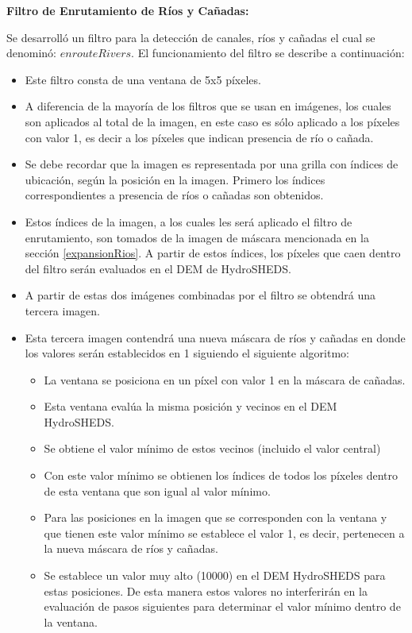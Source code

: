 \documentclass[10pt,a4paper, twoside]{report}
\begin{document}
\textbf{Filtro de Enrutamiento de Ríos y Cañadas:} 

Se desarrolló un filtro para la detección de canales, ríos y cañadas el cual se denominó: $enrouteRivers$. El funcionamiento del filtro se describe a continuación:

\begin{itemize}
	\item Este filtro consta de una ventana de 5x5 píxeles. 
	\item A diferencia de la mayoría de los filtros que se usan en imágenes, los cuales son aplicados al total de la imagen, en este caso es sólo aplicado a los píxeles con valor 1, es decir a los píxeles que indican presencia de río o cañada. 
	\item Se debe recordar que la imagen es representada por una grilla con índices de ubicación, según la posición en la imagen. Primero los índices correspondientes a presencia de ríos o cañadas son obtenidos.
	\item Estos índices de la imagen, a los cuales les será aplicado el filtro de enrutamiento, son tomados de la imagen de máscara mencionada en la sección \ref{expansionRios}. A partir de estos índices, los píxeles que caen dentro del filtro serán evaluados en el DEM de HydroSHEDS.
	\item A partir de estas dos imágenes combinadas por el filtro se obtendrá una tercera imagen.
	\item Esta tercera imagen contendrá una nueva máscara de ríos y cañadas en donde los valores serán establecidos en 1 siguiendo el siguiente algoritmo:	
	\begin{itemize}
		\item La ventana se posiciona en un píxel con valor 1 en la máscara de cañadas.
		\item Esta ventana evalúa la misma posición y vecinos en el DEM HydroSHEDS.
		\item Se obtiene el valor mínimo de estos vecinos (incluido el valor central)
		\item Con este valor mínimo se obtienen los índices de todos los píxeles dentro de esta ventana que son igual al valor mínimo.
		\item Para las posiciones en la imagen que se corresponden con la ventana y que tienen este valor mínimo se establece el valor 1, es decir, pertenecen a la nueva máscara de ríos y cañadas.
		\item Se establece un valor muy alto (10000) en el DEM HydroSHEDS para estas posiciones. De esta manera estos valores no interferirán en la evaluación de pasos siguientes para determinar el valor mínimo dentro de la ventana.
	\end{itemize}
\end{itemize}
\end{document}
